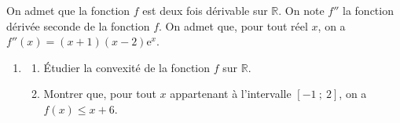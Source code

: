 On admet que la fonction $f$ est deux fois dérivable sur $\mathbb{R}$. On note $f''$ la fonction dérivée seconde de la fonction $f$. On admet que, pour tout réel $x$, on a $f''(x) = (x + 1)(x - 2) \mathrm{e}^{x}$.

\begin{enumerate}[resume]
\item 
	\begin{enumerate}
		\item Étudier la convexité de la fonction $f$ sur $\mathbb{R}$.
		\item Montrer que, pour tout $x$ appartenant à l'intervalle $[-1~;~2]$, on a $f(x) \leqslant x + 6$.	
	\end{enumerate}
\end{enumerate}

\bigskip
